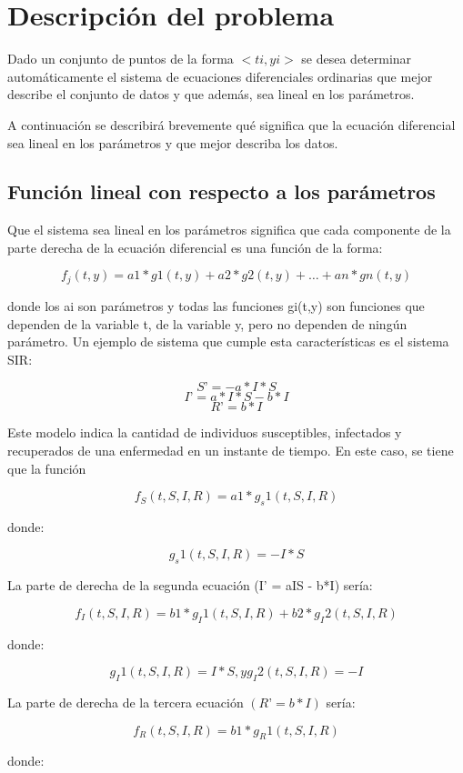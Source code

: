 \chapter{Descripción del problema}\label{chapter:problemIntro}

Dado un conjunto de puntos de la forma $<ti, yi>$ se desea determinar automáticamente el sistema de ecuaciones diferenciales ordinarias que mejor describe el conjunto de datos y que además, sea lineal en los parámetros.

A continuación se describirá brevemente qué significa que la ecuación diferencial sea lineal en los parámetros y que mejor describa los datos.

\section{Función lineal con respecto a los parámetros}

Que el sistema sea lineal en los parámetros significa que cada componente de la parte derecha de la ecuación diferencial es una función de la forma:

$$f_j(t,y) = a1 * g1(t,y) + a2 * g2(t,y) + …  + an * gn(t,y)$$

donde los ai son parámetros y todas las funciones gi(t,y) son funciones que dependen de la variable t, de la variable y, pero no dependen de ningún parámetro.  Un ejemplo de sistema que cumple esta características es el sistema SIR:

$$S’ = - a*I*S$$
$$I’ = a*I*S - b*I$$
$$R’ = b*I$$

Este modelo indica la cantidad de individuos susceptibles, infectados y recuperados de una enfermedad en un instante de tiempo. En este caso, se tiene que la función

$$f_S (t,S,I,R) = a1 * g_s1 (t,S,I,R)$$

donde:

$$g_s1(t,S,I,R) = -I*S$$

La parte de derecha de la segunda ecuación (I’ = a\*I\*S - b*I) sería:

$$f_I (t,S,I,R) = b1 * g_I1 (t,S,I,R) + b2 * g_I2 (t,S,I,R)$$

donde:

$$g_I1(t,S,I,R) = I*S, y g_I2(t,S,I,R) = -I$$

La parte de derecha de la tercera ecuación $(R’ = b*I)$ sería:

$$f_R (t,S,I,R) = b1 * g_R1 (t,S,I,R)$$

donde:

